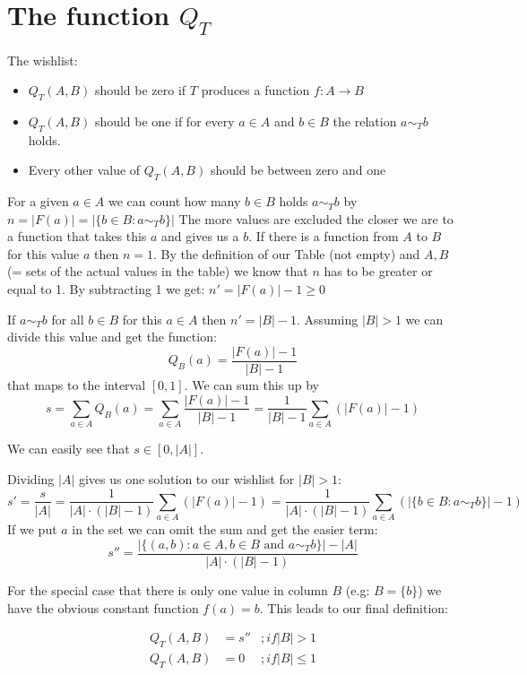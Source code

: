 \documentclass[a4paper]{article}
\begin{document}
\section{The function $Q_T$}

The wishlist:
\begin{itemize}
\item $Q_T(A,B)$ should be zero if $T$ produces a function $f : A \to B$
\item $Q_T(A,B)$ should be one if for every $a \in A$ and $b \in B$ the relation $a \sim_T b$ holds.
\item Every other value of $Q_T(A,B)$ should be between zero and one
\end{itemize}


For a given $a \in A$ we can count how many $b \in B$ holds $a \sim_T b$ by $n = |F(a)| = |\{ b \in B : a \sim_T b \}|$
The more values are excluded the closer we are to a function that takes this $a$ and gives us a $b$.
If there is a function from $A$ to $B$ for this value $a$ then $n = 1$.
By the definition of our Table (not empty) and $A, B$ (= sets of the actual values in the table) we know that $n$ has to be greater or equal to 1.
By subtracting 1 we get: $n' = |F(a)| - 1 \geq 0$

If $a \sim_T b$ for all $b\in B$ for this $a \in A$ then $n' = |B| - 1$.
Assuming $|B| > 1$ we can divide this value and get the function:
\[
  Q_B(a) = \frac{|F(a)| - 1}{|B| - 1}
\]
that maps to the interval $[0, 1]$.
We can sum this up by 
\[
  s = \sum_{a \in A} Q_B(a)
  = \sum_{a \in A} \frac{|F(a)| - 1}{|B| - 1}
  = \frac{1}{|B| - 1} \sum_{a \in A} (|F(a)| - 1)
\]

We can easily see that $s \in [0, |A|]$.

Dividing $|A|$ gives us one solution to our wishlist for $|B| > 1$:
\[
  s' = \frac{s}{|A|}
  = \frac{1}{|A| \cdot (|B| - 1)} \sum_{a \in A} (|F(a)| - 1)
  = \frac{1}{|A| \cdot (|B| - 1)} \sum_{a \in A} (|\{ b \in B : a \sim_T b \}| - 1)
\]
If we put $a$ in the set we can omit the sum and get the easier term:
\[
  s'' = \frac{|\{ (a,b) : a \in A, b \in B \mbox{ and } a \sim_T b \}| - |A|}{|A| \cdot (|B| - 1)}
\]

For the special case that there is only one value in column $B$ (e.g: $B = \{ b \}$) we have the obvious constant function $f(a) = b$.
This leads to our final definition:

\[
\begin{array}{lll}
 Q_T( A, B ) & = s'' & ; if |B| > 1 \\
 Q_T(A, B)   &  = 0  & ; if |B| \leq 1 
\end{array}
\]
\end{document}
